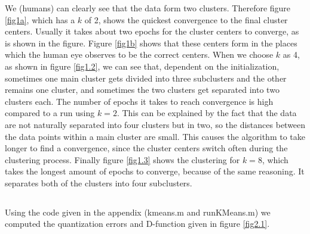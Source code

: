 \documentclass[10pt]{article}
\begin{document}
\noindent We (humans) can clearly see that the data form two clusters. Therefore figure \ref{fig1a}, which has a $k$ of 2, shows the quickest convergence to the final cluster centers. Usually it takes about two epochs for the cluster centers to converge, as is shown in the figure. Figure \ref{fig1b} shows that these centers form in the places which the human eye observes to be the correct centers. When we choose $k$ as 4, as shown in figure \ref{fig1.2}, we can see that, dependent on the initialization, sometimes one main cluster gets divided into three subclusters and the other remains one cluster, and sometimes the two clusters get separated into two clusters each. The number of epochs it takes to reach convergence is high compared to a run using $k=2$. This can be explained by the fact that the data are not naturally separated into four clusters but in two, so the distances between the data points within a main cluster are small. This causes the algorithm to take longer to find a convergence, since the cluster centers switch often during the clustering process. Finally figure \ref{fig1.3} shows the clustering for $k = 8$, which takes the longest amount of epochs to converge, because of the same reasoning. It separates both of the clusters into four subclusters. 

\subsection{}
Using the code given in the appendix (kmeans.m and runKMeans.m) we computed the quantization errors and D-function given in figure \ref{fig2.1}.
\end{document}
